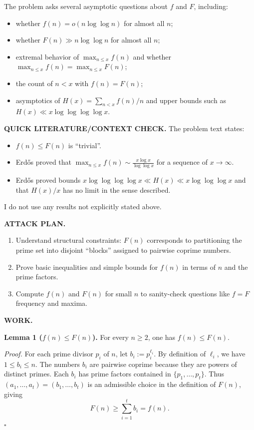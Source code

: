 The problem asks several asymptotic questions about $f$ and $F$, including:
\begin{itemize}
\item whether $f(n)=o(n\log\log n)$ for almost all $n$;
\item whether $F(n)\gg n\log\log n$ for almost all $n$;
\item extremal behavior of $\max_{n\le x} f(n)$ and whether $\max_{n\le x} f(n)=\max_{n\le x}F(n)$;
\item the count of $n<x$ with $f(n)=F(n)$;
\item asymptotics of $H(x)=\sum_{n<x} f(n)/n$ and upper bounds such as $H(x)\ll x\log\log\log\log x$.
\end{itemize}

\medskip
\noindent\textbf{QUICK LITERATURE/CONTEXT CHECK.}
The problem text states:
\begin{itemize}
\item $f(n)\le F(n)$ is ``trivial''.
\item Erd\H{o}s proved that $\max_{n\le x} f(n)\sim \frac{x\log x}{\log\log x}$ for a sequence of $x\to\infty$.
\item Erd\H{o}s proved bounds $x\log\log\log\log x\ll H(x)\ll x\log\log\log x$ and that $H(x)/x$ has no limit in the sense described.
\end{itemize}
I do not use any results not explicitly stated above.

\medskip
\noindent\textbf{ATTACK PLAN.}
\begin{enumerate}
\item Understand structural constraints: $F(n)$ corresponds to partitioning the prime set into disjoint ``blocks'' assigned to pairwise coprime numbers.
\item Prove basic inequalities and simple bounds for $f(n)$ in terms of $n$ and the prime factors.
\item Compute $f(n)$ and $F(n)$ for small $n$ to sanity-check questions like $f=F$ frequency and maxima.
\end{enumerate}

\medskip
\noindent\textbf{WORK.}

\noindent\textbf{Lemma 1 ($f(n)\le F(n)$).}
For every $n\ge 2$, one has $f(n)\le F(n)$.

\noindent\emph{Proof.}
For each prime divisor $p_i$ of $n$, let $b_i:=p_i^{\ell_i}$. By definition of $\ell_i$, we have $1\le b_i\le n$.
The numbers $b_i$ are pairwise coprime because they are powers of distinct primes.
Each $b_i$ has prime factors contained in $\{p_1,\dots,p_t\}$.
Thus $(a_1,\dots,a_t)=(b_1,\dots,b_t)$ is an admissible choice in the definition of $F(n)$, giving
\[
F(n)\ge \sum_{i=1}^t b_i = f(n).
\]
\hfill$\square$

